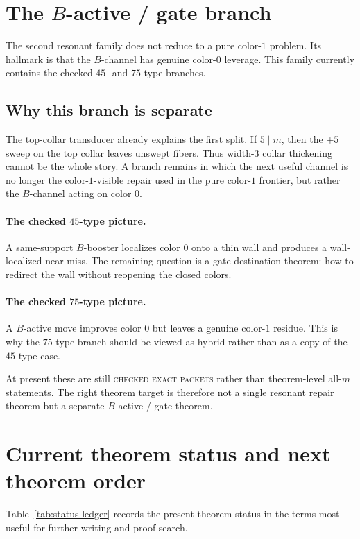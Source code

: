 \documentclass[11pt]{article}
\newcommand{\status}[1]{\textsc{#1}}
\begin{document}
\section{The \texorpdfstring{$B$}{B}-active / gate branch}

The second resonant family does not reduce to a pure color-$1$ problem.
Its hallmark is that the $B$-channel has genuine color-$0$ leverage.
This family currently contains the checked $45$- and $75$-type branches.

\subsection{Why this branch is separate}

The top-collar transducer already explains the first split.
If $5\mid m$, then the $+5$ sweep on the top collar leaves unswept fibers.
Thus width-$3$ collar thickening cannot be the whole story.
A branch remains in which the next useful channel is no longer the
color-$1$-visible repair used in the pure color-$1$ frontier, but rather the
$B$-channel acting on color $0$.

\paragraph{The checked $45$-type picture.}
A same-support $B$-booster localizes color $0$ onto a thin wall and produces a
wall-localized near-miss.
The remaining question is a gate-destination theorem: how to redirect the wall
without reopening the closed colors.

\paragraph{The checked $75$-type picture.}
A $B$-active move improves color $0$ but leaves a genuine color-$1$ residue.
This is why the $75$-type branch should be viewed as hybrid rather than as a
copy of the $45$-type case.

At present these are still \status{checked exact packets} rather than theorem-level
all-$m$ statements.
The right theorem target is therefore not a single resonant repair theorem but a
separate $B$-active / gate theorem.

\section{Current theorem status and next theorem order}

Table~\ref{tab:status-ledger} records the present theorem status in the terms
most useful for further writing and proof search.
\end{document}
